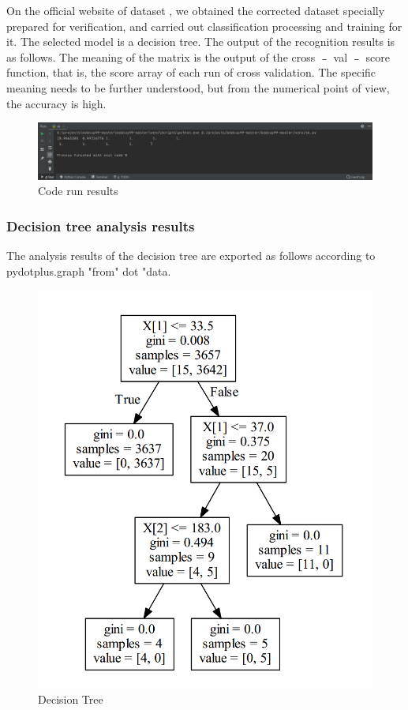 \documentclass[UTF8]{article}
\begin{document}
On the official website of dataset \cite{15}, we obtained the corrected dataset specially prepared for verification, and carried out classification processing and training for it. The selected model is a decision tree. The output of the recognition results is as follows. The meaning of the matrix is the output of the cross ﹣ val ﹣ score function, that is, the score array of each run of cross validation. The specific meaning needs to be further understood, but from the numerical point of view, the accuracy is high.

\begin{figure}[h]
\centering
\includegraphics[scale = 0.3]{2}
\caption{Code run results}
\end{figure}

\subsubsection{Decision tree analysis results}

The analysis results of the decision tree are exported as follows according to pydotplus.graph "from" dot "data.

\begin{figure}[h]
\centering
\includegraphics[scale = 0.2]{3}
\caption{Decision Tree}
\end{figure}
\end{document}
